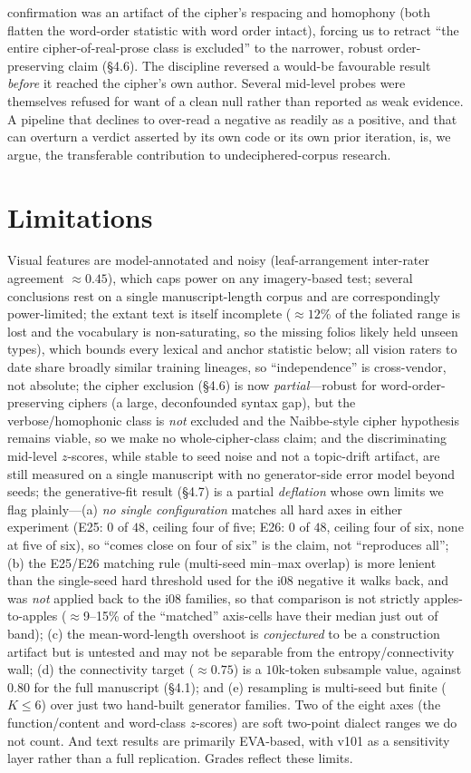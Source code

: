 \documentclass[11pt]{article}
\begin{document}
confirmation was an artifact of the cipher's respacing and homophony (both flatten the
word-order statistic with word order intact), forcing us to retract ``the entire
cipher-of-real-prose class is excluded'' to the narrower, robust order-preserving claim
(\S4.6). The discipline reversed a would-be favourable result \emph{before} it reached the
cipher's own author. Several mid-level
probes were themselves refused for want of a clean null rather than reported as weak
evidence. A pipeline that declines to over-read a negative as readily as a positive, and
that can overturn a
verdict asserted by its own code or its own prior iteration, is, we argue, the
transferable contribution to undeciphered-corpus research.

\section{Limitations}
Visual features are model-annotated and noisy (leaf-arrangement inter-rater agreement
$\approx 0.45$), which caps power on any imagery-based test; several conclusions rest
on a single manuscript-length corpus and are correspondingly power-limited; the extant
text is itself incomplete ($\approx\!12\%$ of the foliated range is lost and the
vocabulary is non-saturating, so the missing folios likely held unseen types), which
bounds every lexical and anchor statistic below; all vision raters to date share
broadly similar training lineages, so ``independence'' is cross-vendor, not absolute;
the cipher exclusion (\S4.6) is now \emph{partial}---robust for word-order-preserving
ciphers (a large, deconfounded syntax gap), but the verbose/homophonic class is \emph{not}
excluded and the Naibbe-style cipher hypothesis remains viable, so we make no
whole-cipher-class claim; and the discriminating mid-level $z$-scores, while stable to seed
noise and not a topic-drift artifact, are still measured on a single manuscript with no
generator-side error model beyond seeds; the generative-fit result (\S4.7) is a partial
\emph{deflation} whose own limits we flag plainly---(a) \emph{no single configuration}
matches all hard axes in either experiment (E25: $0$ of $48$, ceiling four of five; E26: $0$
of $48$, ceiling four of six, none at five of six), so ``comes close on four of six'' is the
claim, not ``reproduces all''; (b) the E25/E26 matching rule (multi-seed min--max
overlap) is more lenient than the single-seed hard threshold used for the i08 negative it
walks back, and was \emph{not} applied back to the i08 families, so that comparison is not
strictly apples-to-apples ($\approx$9--15\% of the ``matched'' axis-cells have their median
just out of band); (c) the mean-word-length overshoot is \emph{conjectured} to be a
construction artifact but is untested and may not be separable from the
entropy/connectivity wall; (d) the connectivity target ($\approx 0.75$) is a $10$k-token
subsample value, against $0.80$ for the full manuscript (\S4.1); and (e) resampling is
multi-seed but finite ($K\!\leq\!6$) over just two hand-built generator families. Two of the
eight axes (the function/content and word-class $z$-scores) are soft two-point dialect
ranges we do not count. And text results are primarily EVA-based,
with v101 as a sensitivity layer rather than a full replication. Grades reflect these
limits.
\end{document}
